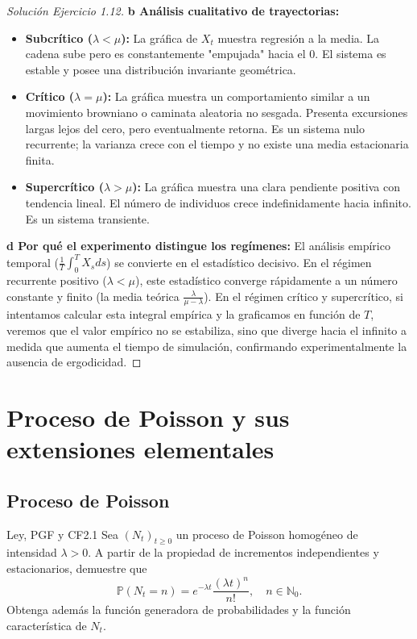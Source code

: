 \documentclass[10pt,a4paper]{article}
\begin{document}
\begin{proof}[Solución Ejercicio 1.12]
    \textbf{b Análisis cualitativo de trayectorias:}
    \begin{itemize}
        \item \textbf{Subcrítico ($\lambda < \mu$):} La gráfica de $X_t$ muestra regresión a la media. La cadena sube pero es constantemente "empujada" hacia el 0. El sistema es estable y posee una distribución invariante geométrica.
        \item \textbf{Crítico ($\lambda = \mu$):} La gráfica muestra un comportamiento similar a un movimiento browniano o caminata aleatoria no sesgada. Presenta excursiones largas lejos del cero, pero eventualmente retorna. Es un sistema nulo recurrente; la varianza crece con el tiempo y no existe una media estacionaria finita.
        \item \textbf{Supercrítico ($\lambda > \mu$):} La gráfica muestra una clara pendiente positiva con tendencia lineal. El número de individuos crece indefinidamente hacia infinito. Es un sistema transiente.
    \end{itemize}

    \textbf{d Por qué el experimento distingue los regímenes:}
    El análisis empírico temporal ($\frac{1}{T}\int_0^T X_s ds$) se convierte en el estadístico decisivo.
    En el régimen recurrente positivo ($\lambda < \mu$), este estadístico converge rápidamente a un número constante y finito (la media teórica $\frac{\lambda}{\mu-\lambda}$). En el régimen crítico y supercrítico, si intentamos calcular esta integral empírica y la graficamos en función de $T$, veremos que el valor empírico no se estabiliza, sino que diverge hacia el infinito a medida que aumenta el tiempo de simulación, confirmando experimentalmente la ausencia de ergodicidad.
\end{proof}

\newpage

\section{Proceso de Poisson y sus extensiones elementales}
\subsection{Proceso de Poisson}

\begin{ejercicio}{Ley, PGF y CF}{2.1}
    Sea $(N_t)_{t\ge 0}$ un proceso de Poisson homogéneo de intensidad $\lambda > 0$. A partir de la propiedad de incrementos independientes y estacionarios, demuestre que
    \[ \mathbb{P}(N_t = n) = e^{-\lambda t}\frac{(\lambda t)^n}{n!}, \quad n \in \mathbb{N}_0. \]
    Obtenga además la función generadora de probabilidades y la función característica de $N_t$.
\end{ejercicio}
\end{document}
